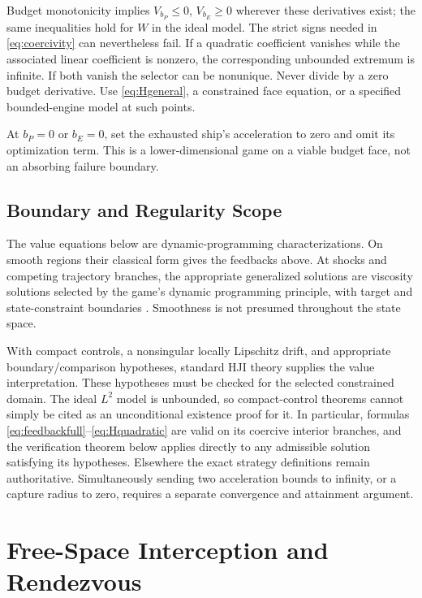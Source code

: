 \documentclass[journal,a4paper]{IEEEtran}
\begin{document}
Budget monotonicity implies $V_{b_P}\le0$, $V_{b_E}\ge0$ wherever these derivatives exist; the same inequalities hold for $W$ in the ideal model. The strict signs needed in \eqref{eq:coercivity} can nevertheless fail. If a quadratic coefficient vanishes while the associated linear coefficient is nonzero, the corresponding unbounded extremum is infinite. If both vanish the selector can be nonunique. Never divide by a zero budget derivative. Use \eqref{eq:Hgeneral}, a constrained face equation, or a specified bounded-engine model at such points.

At $b_P=0$ or $b_E=0$, set the exhausted ship's acceleration to zero and omit its optimization term. This is a lower-dimensional game on a viable budget face, not an absorbing failure boundary.

\subsection{Boundary and Regularity Scope}
The value equations below are dynamic-programming characterizations. On smooth regions their classical form gives the feedbacks above. At shocks and competing trajectory branches, the appropriate generalized solutions are viscosity solutions selected by the game's dynamic programming principle, with target and state-constraint boundaries \cite{Soravia1993}. Smoothness is not presumed throughout the state space.

With compact controls, a nonsingular locally Lipschitz drift, and appropriate boundary/comparison hypotheses, standard HJI theory supplies the value interpretation. These hypotheses must be checked for the selected constrained domain. The ideal $L^2$ model is unbounded, so compact-control theorems cannot simply be cited as an unconditional existence proof for it. In particular, formulas \eqref{eq:feedbackfull}--\eqref{eq:Hquadratic} are valid on its coercive interior branches, and the verification theorem below applies directly to any admissible solution satisfying its hypotheses. Elsewhere the exact strategy definitions remain authoritative. Simultaneously sending two acceleration bounds to infinity, or a capture radius to zero, requires a separate convergence and attainment argument.

\section{Free-Space Interception and Rendezvous}
\label{sec:free}
\end{document}
